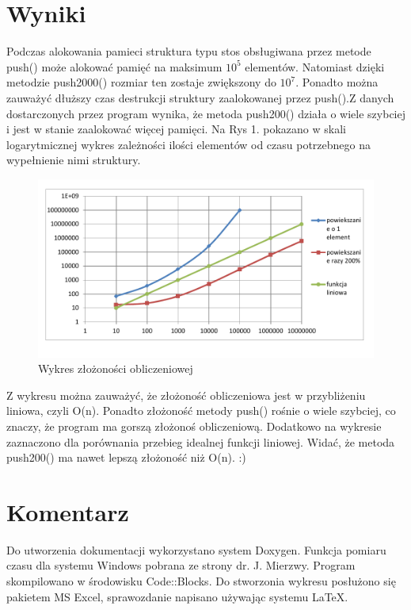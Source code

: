 \section{Wyniki}
Podczas alokowania pamieci struktura typu stos obsługiwana przez metode push() może alokować pamięć na maksimum $10^{5}$ elementów. Natomiast dzięki metodzie push2000() rozmiar ten zostaje zwiększony do $10^{7}$. Ponadto można zauważyć dłuższy czas destrukcji struktury zaalokowanej przez push().Z danych dostarczonych przez program wynika, że metoda push200() działa o wiele szybciej i jest w stanie zaalokować więcej pamięci. Na Rys 1. pokazano w skali logarytmicznej wykres zależności ilości elementów od czasu potrzebnego na wypełnienie nimi struktury.
\begin{figure}[h!]
\centering
\includegraphics[scale=0.7]{wykres1}
\caption{Wykres złożoności obliczeniowej}
\label{fig:wykres1}
\end{figure}
Z wykresu można zauważyć, że złożoność obliczeniowa jest w przybliżeniu liniowa, czyli O(n). Ponadto złożoność metody push() rośnie o wiele szybciej, co znaczy, że program ma gorszą złożonoś obliczeniową. Dodatkowo na wykresie zaznaczono dla porównania przebieg idealnej funkcji liniowej. Widać, że metoda push200() ma nawet lepszą złożoność niż O(n). :)
\section{Komentarz}
Do utworzenia dokumentacji wykorzystano system Doxygen.
Funkcja pomiaru czasu dla systemu Windows pobrana ze strony dr. J. Mierzwy. Program skompilowano w środowisku Code::Blocks. Do stworzonia wykresu posłużono się pakietem MS Excel, sprawozdanie napisano używając systemu \LaTeX.
